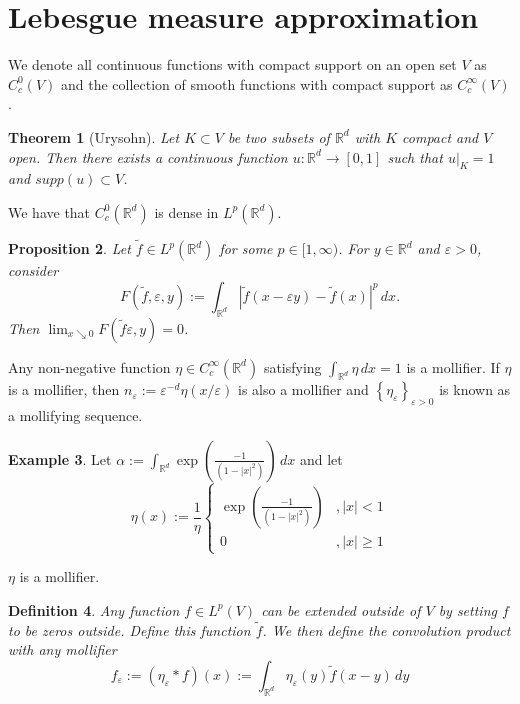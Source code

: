 \documentclass{article}
\newtheorem{theorem}{Theorem}
\newtheorem{proposition}[theorem]{Proposition}
\newtheorem{definition}[theorem]{Definition}
\theoremstyle{definition}
\newtheorem{example}[theorem]{Example}
\numberwithin{theorem}{section}
\numberwithin{equation}{section}
\begin{document}
\section{Lebesgue measure approximation}
We denote all continuous functions with compact support on an open set $V$ as $C^0_c(V)$ and the collection of smooth functions with compact support as $C^\infty_c(V)$. 
\begin{theorem}[Urysohn]
	Let $K \subset V$ be two subsets of $\mathbb{R}^d$ with $K$ compact and $V$ open. Then there exists a continuous function $u: \mathbb{R}^d  \rightarrow [0, 1]$ such that $u|_K = 1$ and $supp(u) \subset V$. 
\end{theorem}

We have that $C^0_c(\mathbb{R}^d)$ is dense in $L^p(\mathbb{R}^d)$. 

\begin{proposition}
	Let $\tilde{f} \in L^p(\mathbb{R}^d)$ for some $p \in [1, \infty)$. For $y \in \mathbb{R}^d$ and $\varepsilon > 0$, consider
	\begin{equation}
		F(\tilde{f}, \varepsilon, y) := \int_{\mathbb{R}^d} |\tilde{f}(x - \varepsilon y) - \tilde{f}(x)|^p \, dx.
	\end{equation}
	Then $\lim_{x \searrow 0} F(\tilde{f} \varepsilon, y) = 0$. 
\end{proposition}
Any non-negative function $\eta \in C^\infty_c(\mathbb{R}^d)$ satisfying $\int_{\mathbb{R}^d} \eta \, dx = 1$ is a mollifier. If $\eta$ is a mollifier, then $n_\varepsilon := \varepsilon^{-d} \eta(x/\varepsilon)$ is also a mollifier and $\left\{\eta_\varepsilon \right\}_{\varepsilon > 0}$ is known as a mollifying sequence. 
\begin{example}
	Let $\alpha := \int_{\mathbb{R}^d}\exp(\frac{-1}{(1 - |x|^2)})\, dx$ and let 
		\begin{equation}
			\eta(x) := \frac{1}{\eta}\begin{cases}
				\exp(\frac{-1}{(1 - |x|^2)}) &, |x| < 1\\
				0 &, |x| \geq 1
			\end{cases}
		\end{equation}
\end{example} 
$\eta$ is a mollifier. 

\begin{definition}
	Any function $f \in L^p(V)$ can be extended outside of $V$ by setting $f$ to be zeros outside. Define this function $\tilde{f}$. We then define the convolution product with any mollifier
	\begin{equation}
		f_\varepsilon := (\eta_\varepsilon \ast f )(x) := \int_{\mathbb{R}^d} \eta_\varepsilon(y) \tilde{f}(x - y) \, dy
	\end{equation}
\end{definition}
\end{document}
